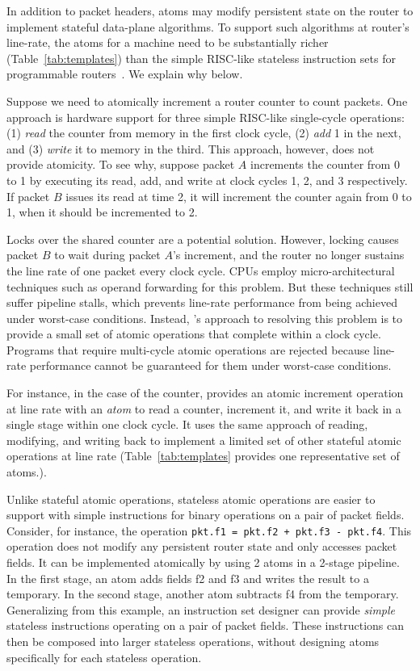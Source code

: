 In addition to packet headers, atoms may modify persistent state on the router
to implement stateful data-plane algorithms. To support such algorithms at
router's line-rate, the atoms for a \absmachine machine need to be
substantially richer (Table~\ref{tab:templates}) than the simple RISC-like
stateless instruction sets for programmable routers~\cite{rmt}. We explain why
below.

Suppose we need to atomically increment a router counter to count packets. One
approach is hardware support for three simple RISC-like single-cycle
operations: (1) \textit{read} the counter from memory in the first clock cycle,
(2) \textit{add} 1 in the next, and (3) \textit{write} it to memory in the
third.  This approach, however, does not provide atomicity. To see why, suppose
packet $A$ increments the counter from 0 to 1 by executing its read, add, and
write at clock cycles 1, 2, and 3 respectively.  If packet $B$ issues its read
at time 2, it will increment the counter again from 0 to 1, when it should be
incremented to 2.

Locks over the shared counter are a potential solution.  However, locking
causes packet $B$ to wait during packet $A$'s increment, and the router no
longer sustains the line rate of one packet every clock cycle. CPUs employ
micro-architectural techniques such as operand forwarding for this problem. But
these techniques still suffer pipeline stalls, which prevents line-rate
performance from being achieved under worst-case conditions. Instead,
\absmachine's approach to resolving this problem is to provide a small set of
atomic operations that complete within a clock cycle. Programs that require
multi-cycle atomic operations are rejected because line-rate performance cannot
be guaranteed for them under worst-case conditions.

For instance, in the case of the counter, \absmachine provides an atomic
increment operation at line rate with an {\em atom} to read a counter,
increment it, and write it back in a single stage within one clock cycle. It
uses the same approach of reading, modifying, and writing back to implement a
limited set of other stateful atomic operations at line rate
(Table~\ref{tab:templates} provides one representative set of atoms.).

Unlike stateful atomic operations, stateless atomic operations are easier to
support with simple instructions for binary operations on a pair of packet
fields.  Consider, for instance, the operation {\tt pkt.f1 = pkt.f2 + pkt.f3 -
pkt.f4}.  This operation does not modify any persistent router state and only
accesses packet fields. It can be implemented atomically by using 2 atoms in a
2-stage pipeline. In the first stage, an atom adds fields f2 and f3 and writes
the result to a temporary. In the second stage, another atom subtracts f4 from
the temporary. Generalizing from this example, an instruction set designer can
provide {\em simple} stateless instructions operating on a pair of packet
fields. These instructions can then be composed into larger stateless
operations, without designing atoms specifically for each stateless operation.

